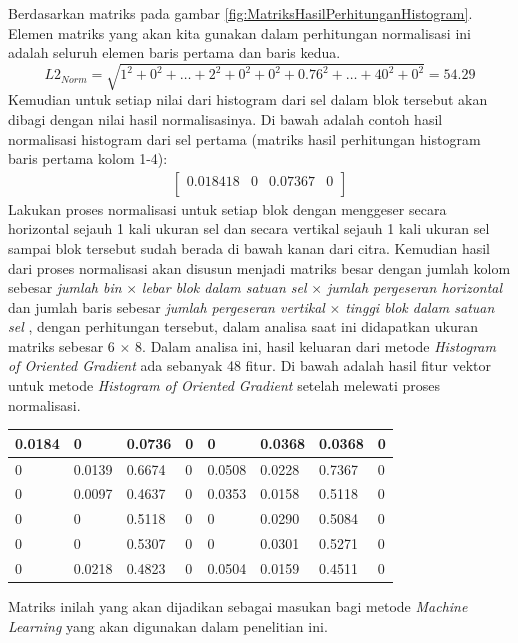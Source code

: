 \begin{enumerate}
\begin{table}[H]
\end{table}
Berdasarkan matriks pada gambar \ref{fig:MatriksHasilPerhitunganHistogram}. Elemen matriks yang akan kita gunakan dalam perhitungan normalisasi ini adalah seluruh elemen baris pertama dan baris kedua.
\begin{equation*}
L2_{Norm} = \sqrt{1^2 + 0^2 + \ldots + 2^2 + 0^2 + 0^2 + 0.76^2 + \ldots + 40^2 + 0^2} = 54.29
\end{equation*}
Kemudian untuk setiap nilai dari histogram dari sel dalam blok tersebut akan dibagi dengan nilai hasil normalisasinya. Di bawah adalah contoh hasil normalisasi histogram dari sel pertama (matriks hasil perhitungan histogram baris pertama kolom 1-4):
\begin{gather*}
\begin{bmatrix}
0.018418 & 0 & 0.07367 & 0 \\
\end{bmatrix}
\end{gather*}
Lakukan proses normalisasi untuk setiap blok dengan menggeser secara horizontal sejauh 1 kali ukuran sel dan secara vertikal sejauh 1 kali ukuran sel sampai blok tersebut sudah berada di bawah kanan dari citra. Kemudian hasil dari proses normalisasi akan disusun menjadi matriks besar dengan jumlah kolom sebesar  \textit{jumlah bin} $\times$ \textit{lebar blok dalam satuan sel} $\times$ \textit{jumlah pergeseran horizontal} dan jumlah baris sebesar \textit{jumlah pergeseran vertikal} $\times$ \textit{tinggi blok dalam satuan sel} , dengan perhitungan tersebut, dalam analisa saat ini didapatkan ukuran matriks sebesar 6 $\times$ 8. Dalam analisa ini, hasil keluaran dari metode \textit{Histogram of Oriented Gradient} ada sebanyak 48 fitur. Di bawah adalah hasil fitur vektor untuk metode \textit{Histogram of Oriented Gradient} setelah melewati proses normalisasi.
\begin{table}[H]
	\centering
	\begin{small}
		\begin{tabular}{|p{1cm}|p{1cm}|p{1cm}|p{1cm}|p{1cm}|p{1cm}|p{1cm}|p{1cm}|}
			\hline
			0.0184 & 0 & 0.0736 & 0 & 0 & 0.0368 & 0.0368 & 0\\
			\hline
			0 & 0.0139 & 0.6674 & 0 & 0.0508 & 0.0228 & 0.7367 & 0\\
			\hline
			0 & 0.0097 & 0.4637 & 0 & 0.0353 & 0.0158 & 0.5118 & 0\\
			\hline
			0 & 0 & 0.5118 & 0 & 0 & 0.0290 & 0.5084 & 0 \\
			\hline
			0 & 0 & 0.5307 & 0 & 0 & 0.0301 & 0.5271 & 0 \\
			\hline
			0 & 0.0218 & 0.4823 & 0 & 0.0504 & 0.0159 & 0.4511 & 0 \\
			\hline
		\end{tabular}
	\end{small}
	\label{fig:MatriksHasilNormalisasi}
\end{table}
Matriks inilah yang akan dijadikan sebagai masukan bagi metode \textit{Machine Learning} yang akan digunakan dalam penelitian ini.\\
\end{enumerate}

